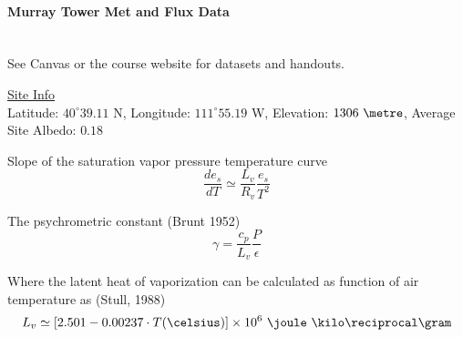 \documentclass[11pt]{article}
\begin{document}
\paragraph{\large Murray Tower Met and Flux Data}~\\
See Canvas or the course website for datasets and handouts.

\underline{Site Info}\\
Latitude: $40^\circ 39.11$ N, Longitude: $111^\circ 55.19$ W, Elevation: $1306\ \metre$, Average Site Albedo: $0.18$

Slope of the saturation vapor pressure temperature curve
$$\frac{de_s}{dT} \simeq \frac{L_v}{R_v}\frac{e_s}{T^2}$$

The psychrometric constant (Brunt 1952)
$$\gamma = \frac{c_p}{L_v}\frac{P}{\epsilon}$$

Where the latent heat of vaporization can be calculated as function of air temperature as (Stull, 1988)
$$L_v \simeq \left[2.501 - 0.00237 \cdot T(\celsius)\right]\times 10^6\ \joule\ \kilo\reciprocal\gram$$
\end{document}

